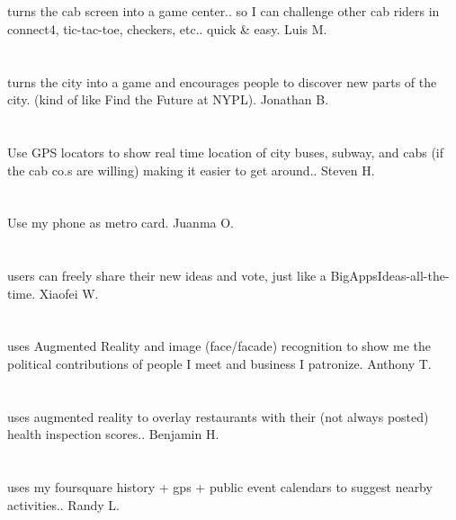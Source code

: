 \section{}turns the cab screen into a game center.. so I can challenge other cab riders in connect4,  tic-tac-toe,  checkers,  etc.. quick \& easy. Luis M.
\section{}turns the city into a game and encourages people to discover new parts of the city. (kind of like Find the Future at NYPL). Jonathan B.
\section{}Use GPS locators to show real time location of city buses,  subway,  and cabs (if the cab co.s are willing) making it easier to get around.. Steven H.
\section{} Use my phone as metro card. Juanma O.
\section{}users can freely share their new ideas and vote,  just like a BigAppsIdeas-all-the-time. Xiaofei W.
\section{}uses Augmented Reality and image (face/facade) recognition to show me the political contributions of people I meet and business I patronize. Anthony T.
\section{}uses augmented reality to overlay restaurants with their (not always posted) health inspection scores.. Benjamin H.
\section{}uses my foursquare history + gps + public event calendars to suggest nearby activities.. Randy L.
